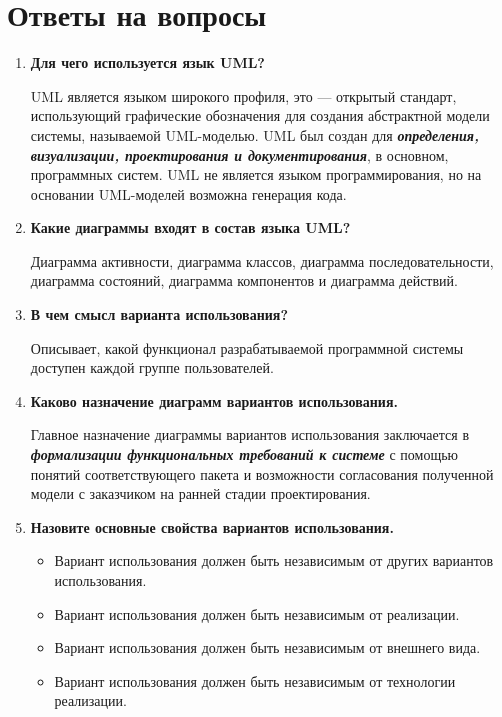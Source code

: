 \newpage

\section*{Ответы на вопросы}

\begin{enumerate}
	\item \textbf{Для чего используется язык UML?}\par
		UML является языком широкого профиля, это --- открытый стандарт,
		использующий графические обозначения для создания абстрактной
		модели системы, называемой UML-моделью. UML был создан для
		\textbf{\textit{определения, визуализации, проектирования
		и документирования}}, в основном, программных систем. UML не является
		языком программирования, но на основании UML-моделей возможна
		генерация кода.
	\item \textbf{Какие диаграммы входят в состав языка UML?}\par
		Диаграмма активности, диаграмма классов, диаграмма последовательности,
		диаграмма состояний, диаграмма компонентов и диаграмма действий.
	\item \textbf{В чем смысл варианта использования?}\par
		Описывает, какой функционал разрабатываемой программной
		системы доступен каждой группе пользователей.
	\item \textbf{Каково назначение диаграмм вариантов использования.}\par
		Главное назначение диаграммы вариантов использования заключается
		в \textbf{\textit{формализации функциональных требований к системе}}
		с помощью понятий соответствующего пакета и возможности согласования
		полученной модели с заказчиком на ранней стадии проектирования.
	\item \textbf{Назовите основные свойства вариантов использования.}\par
		\begin{itemize}
			\item Вариант использования должен быть независимым от других
				вариантов использования.
			\item Вариант использования должен быть независимым от реализации.
			\item Вариант использования должен быть независимым от внешнего
				вида.
			\item Вариант использования должен быть независимым от технологии
				реализации.
		\end{itemize}

\end{enumerate}
